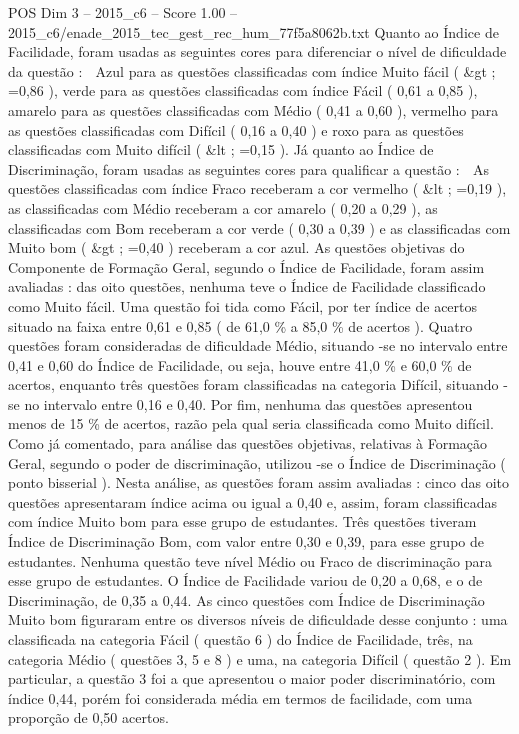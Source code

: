\begin{textsample}{POS Dim 3 – 2015\_c6 – Score 1.00 – 2015\_c6/enade\_2015\_tec\_gest\_rec\_hum\_77f5a8062b.txt}
Quanto ao Índice de Facilidade, foram usadas as seguintes cores para diferenciar o nível de dificuldade da questão :  Azul para as questões classificadas com índice Muito fácil ( \&gt ; =0,86 ), verde para as questões classificadas com índice Fácil ( 0,61 a 0,85 ), amarelo para as questões classificadas com Médio ( 0,41 a 0,60 ), vermelho para as questões classificadas com Difícil ( 0,16 a 0,40 ) e roxo para as questões classificadas com Muito difícil ( \&lt ; =0,15 ).
Já quanto ao Índice de Discriminação, foram usadas as seguintes cores para qualificar a questão :  As questões classificadas com índice Fraco receberam a cor vermelho ( \&lt ; =0,19 ), as classificadas com Médio receberam a cor amarelo ( 0,20 a 0,29 ), as classificadas com Bom receberam a cor verde ( 0,30 a 0,39 ) e as classificadas com Muito bom ( \&gt ; =0,40 ) receberam a cor azul.
As questões objetivas do Componente de Formação Geral, segundo o Índice de Facilidade, foram assim avaliadas : das oito questões, nenhuma teve o Índice de Facilidade classificado como Muito fácil.
Uma questão foi tida como Fácil, por ter índice de acertos situado na faixa entre 0,61 e 0,85 ( de 61,0 \% a 85,0 \% de acertos ).
Quatro questões foram consideradas de dificuldade Médio, situando -se no intervalo entre 0,41 e 0,60 do Índice de Facilidade, ou seja, houve entre 41,0 \% e 60,0 \% de acertos, enquanto três questões foram classificadas na categoria Difícil, situando -se no intervalo entre 0,16 e 0,40.
Por fim, nenhuma das questões apresentou menos de 15 \% de acertos, razão pela qual seria classificada como Muito difícil.
Como já comentado, para análise das questões objetivas, relativas à Formação Geral, segundo o poder de discriminação, utilizou -se o Índice de Discriminação ( ponto bisserial ).
Nesta análise, as questões foram assim avaliadas : cinco das oito questões apresentaram índice acima ou igual a 0,40 e, assim, foram classificadas com índice Muito bom para esse grupo de estudantes.
Três questões tiveram Índice de Discriminação Bom, com valor entre 0,30 e 0,39, para esse grupo de estudantes.
Nenhuma questão teve nível Médio ou Fraco de discriminação para esse grupo de estudantes.
O Índice de Facilidade variou de 0,20 a 0,68, e o de Discriminação, de 0,35 a 0,44.
As cinco questões com Índice de Discriminação Muito bom figuraram entre os diversos níveis de dificuldade desse conjunto : uma classificada na categoria Fácil ( questão 6 ) do Índice de Facilidade, três, na categoria Médio ( questões 3, 5 e 8 ) e uma, na categoria Difícil ( questão 2 ).
Em particular, a questão 3 foi a que apresentou o maior poder discriminatório, com índice 0,44, porém foi considerada média em termos de facilidade, com uma proporção de 0,50 acertos.

\end{textsample}
